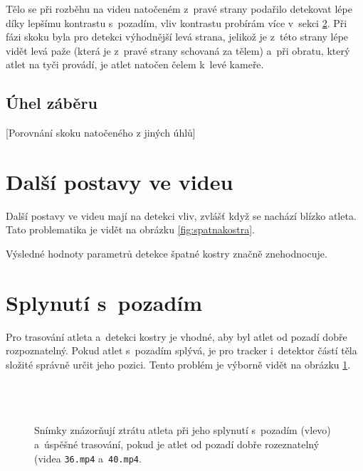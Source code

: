 Tělo se při rozběhu na videu natočeném z~pravé strany podařilo detekovat lépe díky lepšímu kontrastu s~pozadím, vliv kontrastu probírám více v~sekci \ref{sec:kontrast}. Při fázi skoku byla pro detekci výhodnější levá strana, jelikož je z~této strany lépe vidět levá paže (která je z~pravé strany schovaná za tělem) a~při obratu, který atlet na tyči provádí, je atlet natočen čelem k~levé kameře.



\subsection{Úhel záběru}

[Porovnání skoku natočeného z jiných úhlů]



\section{Další postavy ve videu}
\label{sec:postavy}

Další postavy ve videu mají na detekci vliv, zvlášť když se nachází blízko atleta. Tato problematika je vidět na obrázku \ref{fig:spatnakostra}.

Výsledné hodnoty parametrů detekce špatné kostry značně znehodnocuje.




\section{Splynutí s~pozadím}
\label{sec:kontrast}

Pro trasování atleta a~detekci kostry je vhodné, aby byl atlet od pozadí dobře rozpoznatelný. Pokud atlet s~pozadím splývá, je pro tracker i~detektor částí těla složité správně určit jeho pozici. Tento problém je výborně vidět na obrázku \ref{fig:kontrast}.

\begin{figure}[p]\centering
     \\
     \\
     \\
    \small
    Snímky znázorňují ztrátu atleta při jeho splynutí s~pozadím (vlevo) a~úspěšné trasování, pokud je atlet od pozadí dobře rozeznatelný (videa \texttt{36.mp4} a~\texttt{40.mp4}. 
    \label{fig:kontrast}
\end{figure}

